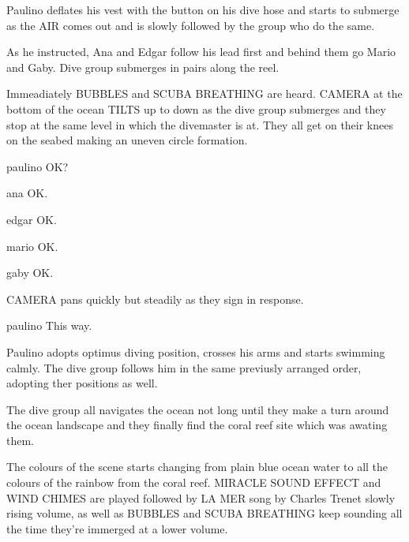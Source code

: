 \documentclass{screenplay}
\begin{document}
Paulino deflates his vest with the button on his dive hose and starts to submerge as the AIR comes out and is slowly followed by the group who do the same.

As he instructed, Ana and Edgar follow his lead first and behind them go Mario and Gaby. Dive group submerges in pairs along the reel.

Immeadiately BUBBLES and SCUBA BREATHING are heard. CAMERA at the bottom of the ocean TILTS up to down as the dive group submerges and they stop at the same level in which the divemaster is at. They all get on their knees on the seabed making an uneven circle formation.

\begin{dialogue}{paulino}
OK?
\end{dialogue}

\begin{dialogue}{ana}
OK.
\end{dialogue}

\begin{dialogue}{edgar}
OK.
\end{dialogue}

\begin{dialogue}{mario}
OK.
\end{dialogue}

\begin{dialogue}{gaby}
OK.
\end{dialogue}

CAMERA pans quickly but steadily as they sign in response.

\begin{dialogue}{paulino}
This way.
\end{dialogue}

Paulino adopts optimus diving position, crosses his arms and starts swimming calmly. The dive group follows him in the same previusly arranged order, adopting ther positions as well.

\pagebreak

The dive group all navigates the ocean not long until they make a turn around the ocean landscape and they finally find the coral reef site which was awating them.

The colours of the scene starts changing from plain blue ocean water to all the colours of the rainbow from the coral reef. MIRACLE SOUND EFFECT and WIND CHIMES are played followed by LA MER song by Charles Trenet slowly rising volume, as well as BUBBLES and SCUBA BREATHING keep sounding all the time they're immerged at a lower volume.
\end{document}
